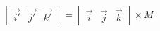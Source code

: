 \documentclass{article}
\begin{document}
\thispagestyle{empty}

$$
\begin{bmatrix}\vec{i'} & \vec{j'} & \vec{k'}\end{bmatrix} =
\begin{bmatrix}\vec{i} & \vec{j} & \vec{k}\end{bmatrix} \times M
$$
\end{document}
